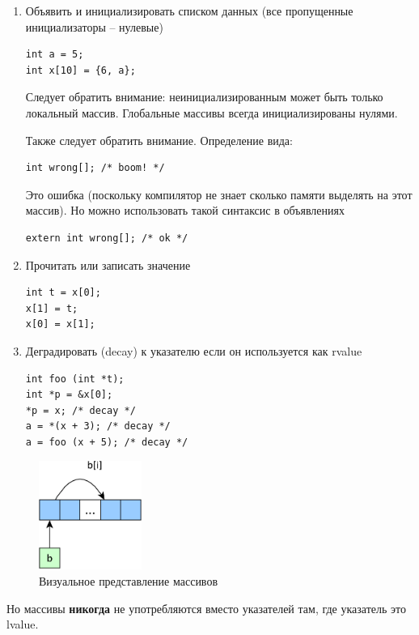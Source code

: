 \documentclass[a4paper,12pt,oneside]{article}
\begin{document}
\begin{enumerate}
\item Объявить и инициализировать списком данных (все пропущенные инициализаторы -- нулевые)
\begin{lstlisting}
int a = 5;
int x[10] = {6, a};
\end{lstlisting}

Следует обратить внимание: неинициализированным может быть только локальный массив. Глобальные массивы всегда инициализированы нулями.

Также следует обратить внимание. Определение вида:
\begin{lstlisting}
int wrong[]; /* boom! */
\end{lstlisting}
Это ошибка (поскольку компилятор не знает сколько памяти выделять на этот массив). Но можно использовать такой синтаксис в объявлениях
\begin{lstlisting}
extern int wrong[]; /* ok */
\end{lstlisting}
\item Прочитать или записать значение
\begin{lstlisting}
int t = x[0];
x[1] = t;
x[0] = x[1];
\end{lstlisting}
\item Деградировать (decay) к указателю если он используется как rvalue\label{ArrDecaying}
\begin{lstlisting}
int foo (int *t);
int *p = &x[0];
*p = x; /* decay */
a = *(x + 3); /* decay */
a = foo (x + 5); /* decay */
\end{lstlisting}
\end{enumerate}

\begin{figure}[h!]
\centering
\includegraphics[width=0.3\textwidth]{illustrations/arrays-crop.pdf}
\caption{Визуальное представление массивов}
\label{fig:arrays-crop}
\end{figure}

Но массивы \textbf{никогда} не употребляются вместо указателей там, где указатель это lvalue.
\end{document}
